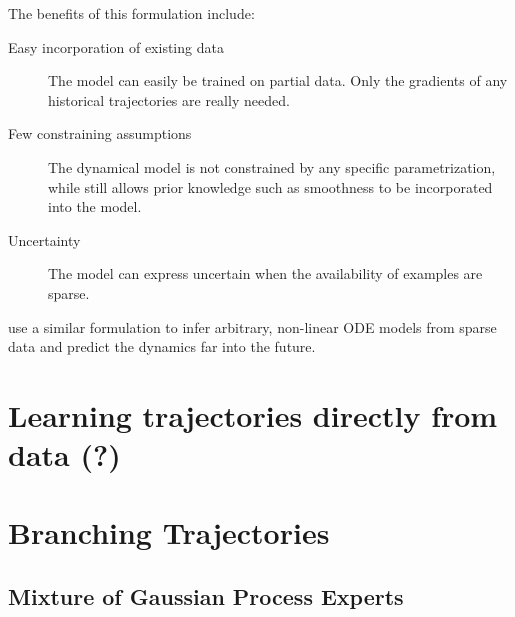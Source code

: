 The benefits of this formulation include:
\begin{description}
    \item[Easy incorporation of existing data] The model can easily be trained on partial data. Only the gradients of any historical trajectories are really needed.
    \item[Few constraining assumptions] The dynamical model is not constrained by any specific parametrization, while still allows prior knowledge such as smoothness to be incorporated into the model.
    \item[Uncertainty] The model can express uncertain when the availability of examples are sparse. 
\end{description}

\cite{heinonen2018learningode} use a similar formulation to infer arbitrary, non-linear ODE models from sparse data and predict the dynamics far into the future. 

\section{Learning trajectories directly from data (?)}
\section{Branching Trajectories}
\subsection{Mixture of Gaussian Process Experts}

